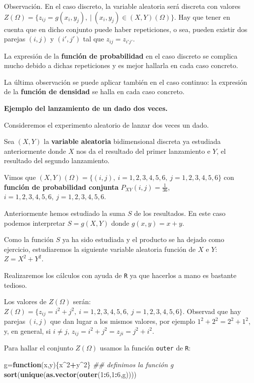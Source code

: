 \documentclass[]{book}
\newenvironment{Shaded}{\begin{snugshade}}{\end{snugshade}}
\newcommand{\CommentTok}[1]{\textcolor[rgb]{0.56,0.35,0.01}{\textit{#1}}}
\newcommand{\ControlFlowTok}[1]{\textcolor[rgb]{0.13,0.29,0.53}{\textbf{#1}}}
\newcommand{\DecValTok}[1]{\textcolor[rgb]{0.00,0.00,0.81}{#1}}
\newcommand{\KeywordTok}[1]{\textcolor[rgb]{0.13,0.29,0.53}{\textbf{#1}}}
\newcommand{\NormalTok}[1]{#1}
\newcommand{\OperatorTok}[1]{\textcolor[rgb]{0.81,0.36,0.00}{\textbf{#1}}}
\begin{document}
Observación.
En el caso discreto, la variable aleatoria será discreta con valores \(Z(\Omega)=\{z_{ij}=g(x_i,y_j),\ |\ (x_i,y_j)\in (X,Y)(\Omega)\}\).
Hay que tener en cuenta que en dicho conjunto puede haber repeticiones, o sea, pueden existir dos parejas \((i,j)\) y \((i',j')\) tal que \(z_{ij}=z_{i'j'}\).

La expresión de la \textbf{función de probabilidad} en el caso discreto se complica mucho debido a dichas repeticiones y es mejor hallarla en cada caso concreto.

La última observación se puede aplicar también en el caso continuo: la expresión de la \textbf{función de densidad} se halla en cada caso concreto.

\textbf{Ejemplo del lanzamiento de un dado dos veces.}

Consideremos el experimento aleatorio de lanzar dos veces un dado.

Sea \((X,Y)\) la \textbf{variable aleatoria} bidimensional discreta ya estudiada anteriormente donde \(X\) nos da el resultado del primer lanzamiento e \(Y\), el resultado del segundo lanzamiento.

Vimos que \((X,Y)(\Omega)=\{(i,j),\ i=1,2,3,4,5,6,\ j=1,2,3,4,5,6\}\) con \textbf{función de probabilidad conjunta} \(P_{XY}(i,j)=\frac{1}{36}\), \(i=1,2,3,4,5,6,\ j=1,2,3,4,5,6.\)

Anteriormente hemos estudiado la suma \(S\) de los resultados. En este caso podemos interpretar \(S=g(X,Y)\) donde \(g(x,y)=x+y\).

Como la función \(S\) ya ha sido estudiada y el producto se ha dejado como ejercicio, estudiaremos la siguiente variable aleatoria función de \(X\) e \(Y\): \(Z=X^2+Y^2\).

Realizaremos los cálculos con ayuda de \texttt{R} ya que hacerlos a mano es bastante tedioso.

Los valores de \(Z(\Omega)\) serán: \(Z(\Omega)=\{z_{ij}=i^2+j^2,\ i=1,2,3,4,5,6,\ j=1,2,3,4,5,6\}\). Observad que hay parejas \((i,j)\) que dan lugar a los mismos valores, por ejemplo \(1^2+2^2 = 2^2+1^2\), y, en general, si \(i\neq j\), \(z_{ij}=i^2+j^2=z_{ji}=j^2+i^2\).

Para hallar el conjunto \(Z(\Omega)\) usamos la función \texttt{outer} de \texttt{R}:

\begin{Shaded}
\begin{Highlighting}[]
\NormalTok{g=}\ControlFlowTok{function}\NormalTok{(x,y)\{x}\OperatorTok{^}\DecValTok{2}\OperatorTok{+}\NormalTok{y}\OperatorTok{^}\DecValTok{2}\NormalTok{\}  }\CommentTok{## definimos la función g}
\KeywordTok{sort}\NormalTok{(}\KeywordTok{unique}\NormalTok{(}\KeywordTok{as.vector}\NormalTok{(}\KeywordTok{outer}\NormalTok{(}\DecValTok{1}\OperatorTok{:}\DecValTok{6}\NormalTok{,}\DecValTok{1}\OperatorTok{:}\DecValTok{6}\NormalTok{,g))))}
\end{Highlighting}
\end{Shaded}
\end{document}
